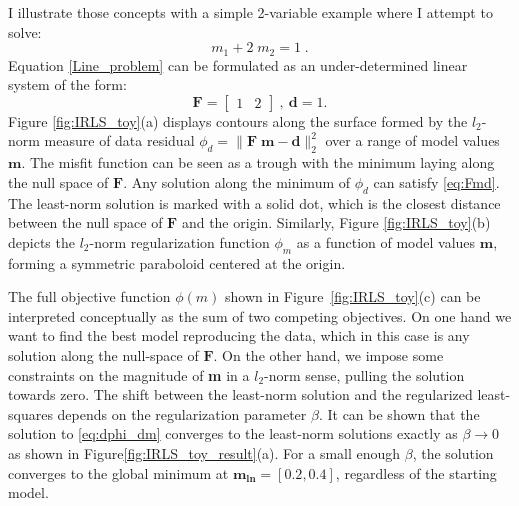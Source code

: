I illustrate those concepts with a simple 2-variable example where I attempt to solve:
\begin{equation}\label{Line_problem}
m_1 + 2\;m_2 = 1 \;.
\end{equation}
Equation \ref{Line_problem} can be formulated as an under-determined linear system of the form:
\begin{equation}
	\mathbf{F} = 
	\begin{bmatrix}
	1 & 2
	\end{bmatrix}\:,\:
	\mathbf{d} = 1 .
\end{equation}
Figure \ref{fig:IRLS_toy}(a) displays contours along the surface formed by the $l_2$-norm measure of data residual $\phi_d = \|\mathbf{ F\;m - d }\|_2^2$ over a range of model values $\mathbf{m}$. 
The misfit function can be seen as a trough with the minimum laying along the null space of $\mathbf{F}$.
Any solution along the minimum of $\phi_d$ can satisfy \ref{eq:Fmd}. 
The least-norm solution is marked with a solid dot, which is the closest distance between the null space of $\mathbf{F}$ and the origin.
Similarly, Figure \ref{fig:IRLS_toy}(b) depicts the $l_2$-norm regularization function $\phi_m$ as a function of model values  $\mathbf{m}$, forming a symmetric paraboloid centered at the origin. 

The full objective function $\phi(m)$ shown in Figure~\ref{fig:IRLS_toy}(c)  can be interpreted conceptually as the sum of two competing objectives. 
On one hand we want to find the best model reproducing the data, which in this case is any solution along the null-space of $\mathbf{F}$. On the other hand, we impose some constraints on the magnitude of \textbf{m} in a $l_2$-norm sense, pulling the solution towards zero.
The shift between the least-norm solution and the regularized least-squares depends on the regularization parameter $\beta$.
It can be shown that the solution to \ref{eq:dphi_dm} converges to the least-norm solutions exactly as $\beta \rightarrow 0$ as shown in Figure\ref{fig:IRLS_toy_result}(a).
For a small enough $\beta$, the solution converges to the global minimum at $\mathbf{m_{ln}}=[0.2,0.4]$, regardless of the starting model.
 
